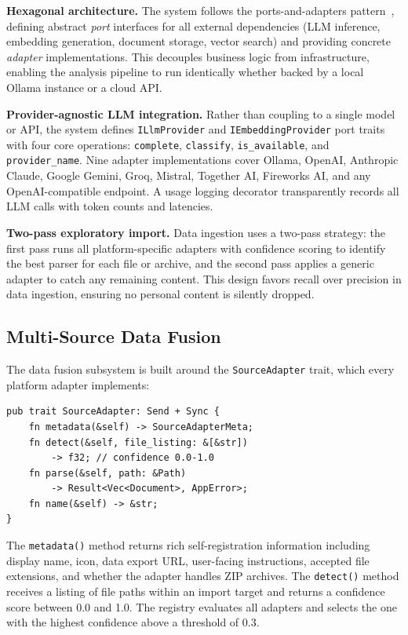 \documentclass[manuscript,review]{acmart}
\begin{document}
\textbf{Hexagonal architecture.}
The system follows the ports-and-adapters pattern~\cite{cockburn2005hexagonal}, defining abstract \emph{port} interfaces for all external dependencies (LLM inference, embedding generation, document storage, vector search) and providing concrete \emph{adapter} implementations.
This decouples business logic from infrastructure, enabling the analysis pipeline to run identically whether backed by a local Ollama instance or a cloud API.

\textbf{Provider-agnostic LLM integration.}
Rather than coupling to a single model or API, the system defines \texttt{ILlmProvider} and \texttt{IEmbeddingProvider} port traits with four core operations: \texttt{complete}, \texttt{classify}, \texttt{is\_available}, and \texttt{provider\_name}.
Nine adapter implementations cover Ollama, OpenAI, Anthropic Claude, Google Gemini, Groq, Mistral, Together AI, Fireworks AI, and any OpenAI-compatible endpoint.
A usage logging decorator transparently records all LLM calls with token counts and latencies.

\textbf{Two-pass exploratory import.}
Data ingestion uses a two-pass strategy: the first pass runs all platform-specific adapters with confidence scoring to identify the best parser for each file or archive, and the second pass applies a generic adapter to catch any remaining content.
This design favors recall over precision in data ingestion, ensuring no personal content is silently dropped.

\subsection{Multi-Source Data Fusion}
\label{sec:data-fusion}

The data fusion subsystem is built around the \texttt{SourceAdapter} trait, which every platform adapter implements:

\begin{lstlisting}[caption={The SourceAdapter trait (Rust).},label={lst:source-adapter}]
pub trait SourceAdapter: Send + Sync {
    fn metadata(&self) -> SourceAdapterMeta;
    fn detect(&self, file_listing: &[&str])
        -> f32; // confidence 0.0-1.0
    fn parse(&self, path: &Path)
        -> Result<Vec<Document>, AppError>;
    fn name(&self) -> &str;
}
\end{lstlisting}

The \texttt{metadata()} method returns rich self-registration information including display name, icon, data export URL, user-facing instructions, accepted file extensions, and whether the adapter handles ZIP archives.
The \texttt{detect()} method receives a listing of file paths within an import target and returns a confidence score between 0.0 and 1.0.
The registry evaluates all adapters and selects the one with the highest confidence above a threshold of 0.3.
\end{document}
